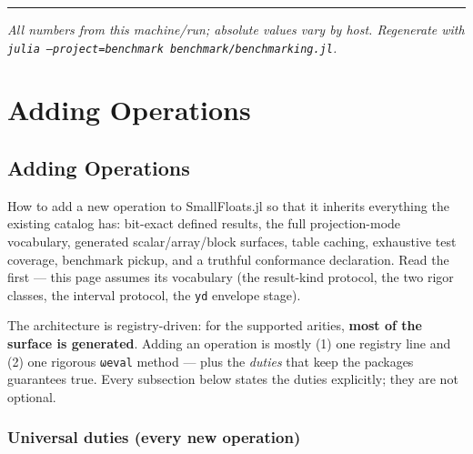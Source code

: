 {\rule{\textwidth}{1pt}}


\emph{All numbers from this machine/run; absolute values vary by host. Regenerate with \texttt{julia --project=benchmark benchmark/benchmarking.jl}.}



\part{Adding Operations}


\chapter{Adding Operations}



\label{5861982930757625708}{}


How to add a new operation to SmallFloats.jl so that it inherits everything the existing catalog has: bit-exact defined results, the full projection-mode vocabulary, generated scalar/array/block surfaces, table caching, exhaustive test coverage, benchmark pickup, and a truthful conformance declaration. Read the  first — this page assumes its vocabulary (the result-kind protocol, the two rigor classes, the interval protocol, the \texttt{yd} envelope stage).



The architecture is registry-driven: for the supported arities, \textbf{most of the surface is generated}. Adding an operation is mostly (1) one registry line and (2) one rigorous \texttt{ωeval} method — plus the \emph{duties} that keep the package{\textquotesingle}s guarantees true. Every subsection below states the duties explicitly; they are not optional.



\section{Universal duties (every new operation)}



\label{15376602000632183864}{}


